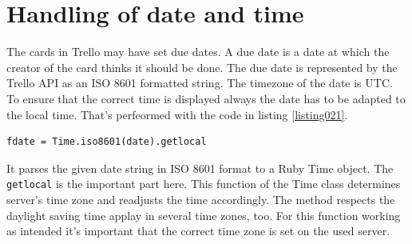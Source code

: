 \section{Handling of date and time}
The cards in Trello may have set due dates. A due date is a date at which the creator of the card thinks it should be done. The due date is represented by the Trello API as an ISO 8601 formatted string. The timezone of the date is UTC. To ensure that the correct time is displayed always the date has to be adapted to the local time. That's perfeormed with the code in listing \ref{listing021}.

\begin{lstlisting}[aboveskip=1\baselineskip, caption=Response of the token request., label=listing021]
fdate = Time.iso8601(date).getlocal
\end{lstlisting}

It parses the given date string in ISO 8601 format to a Ruby Time object. The \lstinline{getlocal} is the important part here. This function of the Time class determines server's time zone and readjusts the time accordingly. The method respects the daylight saving time applay in several time zones, too. For this function working as intended it's important that the correct time zone is set on the used server. 

